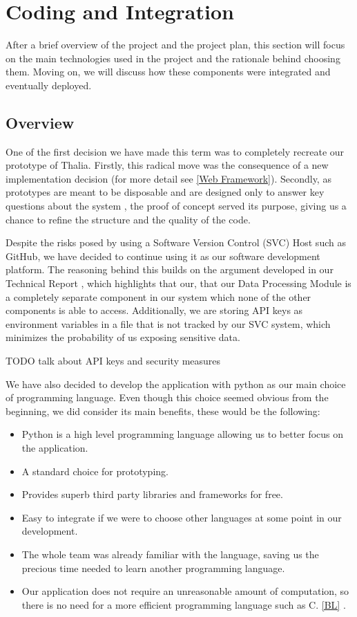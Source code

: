 \documentclass[main.tex]{subfiles}
\begin{document}
\section{Coding and Integration}

After a brief overview of the project and the project plan, this section will focus on the main technologies used in the project and the rationale behind choosing them. Moving on, we will discuss how these components were integrated and eventually deployed.

\subsection{Overview}

One of the first decision we have made this term was to completely recreate our prototype of Thalia. Firstly, this radical move was the consequence of a new implementation decision (for more detail see \ref{Web Framework}). Secondly, as prototypes are meant to be disposable and are designed only to answer key questions about the system \cite{pragmaticprog}, the proof of concept served its purpose, giving us a chance to refine the structure and the quality of the code.

Despite the risks posed by using a Software Version Control (SVC) Host such as GitHub, we have decided to continue using it as our software development platform. The reasoning behind this builds on the argument developed in our Technical Report \cite{TR}, which highlights that our, that our Data Processing Module is a completely separate component in our system which none of the other components is able to access. Additionally, we are storing API keys as environment variables in a file that is not tracked by our SVC system, which minimizes the probability of us exposing sensitive data.



TODO talk about API keys and security measures

We have also decided to develop the application with python as our main choice of programming language. Even though this choice seemed obvious from the beginning, we did consider its main benefits, these would be the following:

\begin{itemize}
    \item Python is a high level programming language allowing us to better focus on the application.
    \item A standard choice for prototyping.
    \item Provides superb third party libraries and frameworks for free.
    \item Easy to integrate if we were to choose other languages at some point in our development.
    \item The whole team was already familiar with the language, saving us the precious time needed to learn another programming language.
    \item Our application does not require an unreasonable amount of computation, so there is no need for a more efficient programming language such as C. \ref{BL} \cite{languagescomparison}.
\end{itemize}
\end{document}
